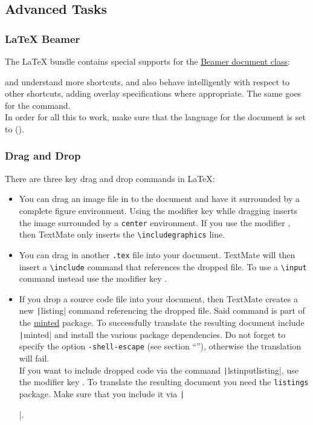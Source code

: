 \documentclass[11pt, x11names]{article}
\begin{document}
\subsection{Advanced Tasks}

\subsubsection{LaTeX Beamer}

The LaTeX bundle contains special supports for the \href{https://bitbucket.org/rivanvx/beamer/wiki/Home}{Beamer document class}:

 and  understand more shortcuts, and also behave intelligently with respect to other shortcuts, adding overlay specifications where appropriate. The same goes for the  command.\\

In order for all this to work, make sure that the language for the document is set to  ().

\subsubsection{Drag and Drop}

There are three key drag and drop commands in LaTeX:

\begin{itemize}

  \item You can drag an image file in to the document and have it surrounded by a complete figure environment. Using the modifier key \keys{\Alt} while dragging inserts the image surrounded by a \texttt{center} environment. If you use the modifier \keys{\shift}, then TextMate only inserts the \texttt{\textbackslash{}includegraphics} line.

  \item You can drag in another \texttt{.tex} file into your document. TextMate will then insert a \texttt{\textbackslash{}include} command that references the dropped file. To use a \texttt{\textbackslash{}input} command instead use the modifier key \keys{\Alt}.

  \item If you drop a source code file into your document, then TextMate creates a new \texttt|listing| command referencing the dropped file. Said command is part of the \href{http://ctan.org/pkg/minted}{minted} package. To successfully translate the resulting document include \texttt|minted| and install the various package dependencies. Do not forget to specify the option \texttt{-shell-escape} (see section “”), otherwise the translation will fail.\\

  If you want to include dropped code via the command \texttt|lstinputlisting|, use the modifier key \keys{\shift}. To translate the resulting document you need the \texttt{listings} package. Make sure that you include it via \texttt|\usepackage{listings}|.

\end{itemize}
\end{document}
